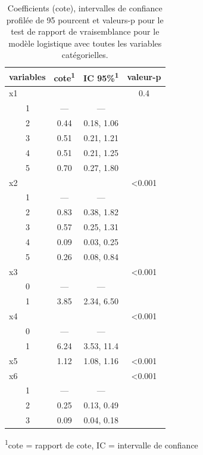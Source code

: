 \documentclass[
  11pt,
  letterpaper,
]{book}
\theoremstyle{definition}
\theoremstyle{remark}
\begin{document}
\hypertarget{tbl-logit1-complet}{}
\setlength{\LTpost}{0mm}
\begin{longtable}{lccc}
\caption{\label{tbl-logit1-complet}Coefficients (cote), intervalles de confiance profilée de 95 pourcent et
valeurs-p pour le test de rapport de vraisemblance pour le modèle
logistique avec toutes les variables catégorielles. }\tabularnewline

\toprule
variables & cote\textsuperscript{1} & IC 95\%\textsuperscript{1} & valeur-p \\ 
\midrule
x1 &  &  & 0.4 \\ 
    1 & — & — &  \\ 
    2 & 0.44 & 0.18, 1.06 &  \\ 
    3 & 0.51 & 0.21, 1.21 &  \\ 
    4 & 0.51 & 0.21, 1.25 &  \\ 
    5 & 0.70 & 0.27, 1.80 &  \\ 
x2 &  &  & <0.001 \\ 
    1 & — & — &  \\ 
    2 & 0.83 & 0.38, 1.82 &  \\ 
    3 & 0.57 & 0.25, 1.31 &  \\ 
    4 & 0.09 & 0.03, 0.25 &  \\ 
    5 & 0.26 & 0.08, 0.84 &  \\ 
x3 &  &  & <0.001 \\ 
    0 & — & — &  \\ 
    1 & 3.85 & 2.34, 6.50 &  \\ 
x4 &  &  & <0.001 \\ 
    0 & — & — &  \\ 
    1 & 6.24 & 3.53, 11.4 &  \\ 
x5 & 1.12 & 1.08, 1.16 & <0.001 \\ 
x6 &  &  & <0.001 \\ 
    1 & — & — &  \\ 
    2 & 0.25 & 0.13, 0.49 &  \\ 
    3 & 0.09 & 0.04, 0.18 &  \\ 
\bottomrule
\end{longtable}
\begin{minipage}{\linewidth}
\textsuperscript{1}cote = rapport de cote, IC = intervalle de confiance\\
\end{minipage}
\end{document}
